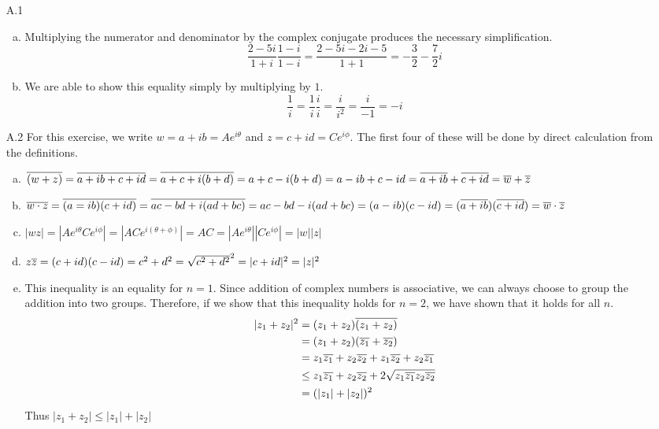 \documentclass[../../Solutions.tex]{subfiles}
\begin{document}
\begin{itemize}
	\item [A.1]
		\begin{enumerate}[(a)]
			\item Multiplying the numerator and denominator by the complex conjugate produces the necessary simplification.
			$$ \frac{2-5i}{1+i}\frac{1-i}{1-i} = \frac{2-5i-2i-5}{1+1} = -\frac{3}{2}-\frac{7}{2}i $$
			\item We are able to show this equality simply by multiplying by $1$.
			$$ \frac{1}{i} = \frac{1}{i}\frac{i}{i} = \frac{i}{i^2} = \frac{i}{-1} = -i $$
		\end{enumerate}
	\item [A.2] For this exercise, we write $w = a+ib = Ae^{i\theta}$ and $z = c+id = Ce^{i\phi}$.
	The first four of these will be done by direct calculation from the definitions.
		\begin{enumerate}[(a)]
			\item $\overline{(w+z)} = \overline{a+ib+c+id} = \overline{a+c+i(b+d)} = a+c-i(b+d) = a-ib+c-id = \overline{a+ib}+\overline{c+id} = \overline{w}+\overline{z}$
			
			\item $\overline{w \cdot z} = \overline{(a=ib)(c+id)} = \overline{ac-bd+i(ad+bc)} = ac-bd-i(ad+bc) = (a-ib)(c-id) = (\overline{a+ib})(\overline{c+id}) = \overline{w} \cdot \overline{z}$
			
			\item $|wz| = |Ae^{i\theta}Ce^{i\phi}| = |ACe^{i(\theta+\phi)}| = AC = |Ae^{i\theta}||Ce^{i\phi}| = |w||z|$
			
			\item $z\overline{z} = (c+id)(c-id) = c^2+d^2 = \sqrt{c^2+d^2}^2 = |c+id|^2 = |z|^2$
			
			\item This inequality is an equality for $n=1$.
			Since addition of complex numbers is associative, we can always choose to group the addition into two groups.
			Therefore, if we show that this inequality holds for $n=2$, we have shown that it holds for all $n$.
			\begin{equation*} \begin{split}
				|z_1+z_2|^2 & = (z_1+z_2)\overline{(z_1+z_2)} \\
							& = (z_1+z_2)(\overline{z_1}+\overline{z_2}) \\
							& = z_1\overline{z_1} + z_2\overline{z_2}+z_1\overline{z_2}+z_2\overline{z_1} \\
							& \leq z_1\overline{z_1} + z_2\overline{z_2} + 2\sqrt{z_1\overline{z_1}z_2\overline{z_2}} \\
							& = (|z_1|+|z_2|)^2
			\end{split} \end{equation*}
			Thus $|z_1+z_2| \leq |z_1|+|z_2|$
			

\end{enumerate}
\end{itemize}
\end{document}
